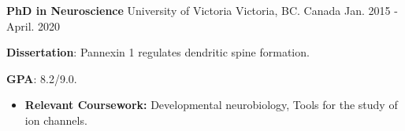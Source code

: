 

\begin{cventries}

\cventry
    {\textbf{PhD in Neuroscience}} %
    {University of Victoria} %
    {Victoria, BC. Canada} %
    {Jan. 2015 - April. 2020} %
    {
      \begin{cvitems} %
        \item \textbf{Dissertation}: Pannexin 1 regulates dendritic spine formation.
        \item \textbf{GPA}: 8.2/9.0.
          \begin{itemize}
          \item \textbf{Relevant Coursework:} Developmental neurobiology, Tools for the study of ion channels.
          \end{itemize}   
      \end{cvitems}
    }
  

\end{cventries}
